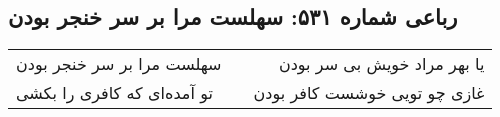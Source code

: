 \begin{center}
\section*{رباعی شماره ۵۳۱: سهلست مرا بر سر خنجر بودن}
\label{sec:sh531}
\begin{longtable}{l p{0.5cm} r}
سهلست مرا بر سر خنجر بودن
&&
یا بهر مراد خویش بی سر بودن
\\
تو آمده‌ای که کافری را بکشی
&&
غازی چو تویی خوشست کافر بودن
\\
\end{longtable}
\end{center}

